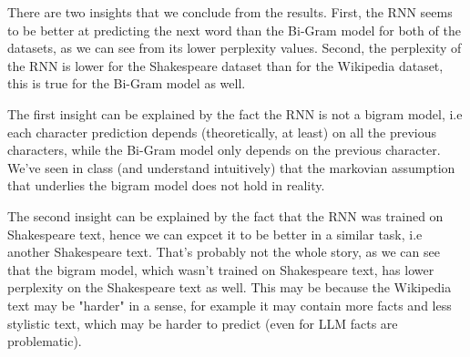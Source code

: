 There are two insights that we conclude from the results. First, the RNN seems to be better at predicting the next word than the Bi-Gram model for both of the datasets, as we can see from its lower perplexity values.
Second, the perplexity of the RNN is lower for the Shakespeare dataset than for the Wikipedia dataset, this is true for the Bi-Gram model as well.

The first insight can be explained by the fact the RNN is not a bigram model, i.e each character prediction depends (theoretically, at least) on all the previous characters, while the Bi-Gram model only depends on the previous character. 
We've seen in class (and understand intuitively) that the markovian assumption that underlies the bigram model does not hold in reality.

The second insight can be explained by the fact that the RNN was trained on Shakespeare text, hence we can expcet it to be better in a similar task, i.e another Shakespeare text. That's probably not the whole story, as we can see that the 
bigram model, which wasn't trained on Shakespeare text, has lower perplexity on the Shakespeare text as well. This may be because the Wikipedia text may be "harder" in a sense, for example it may contain more facts and less
stylistic text, which may be harder to predict (even for LLM facts are problematic).
